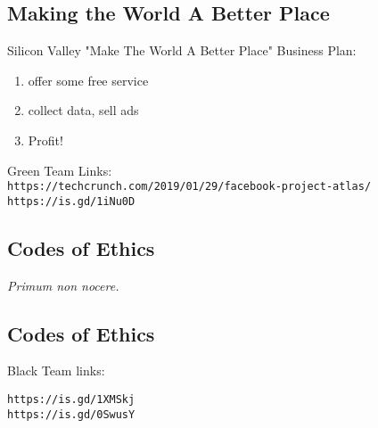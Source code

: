 \documentclass[xga]{xdvislides}
\begin{document}
\subsection{Making the World A Better Place}
Silicon Valley "Make The World A Better Place"
Business Plan:

\vspace*{\fill}
\begin{enumerate}
	\item offer some free service
	\item collect data, sell ads
	\item Profit!
\end{enumerate}

\vspace{1in}

Green Team Links: \\
\verb+https://techcrunch.com/2019/01/29/facebook-project-atlas/+ \\
\verb+https://is.gd/1iNu0D+

\vspace*{\fill}

\subsection{Codes of Ethics}
\Huge
\vspace*{\fill}
\begin{center}
	{\em Primum non nocere.}
\end{center}
\vspace*{\fill}
\Normalsize

\subsection{Codes of Ethics}
Black Team links: \\

\vspace{1in}

\verb+https://is.gd/1XMSkj+ \\
\verb+https://is.gd/0SwusY+

\end{document}
